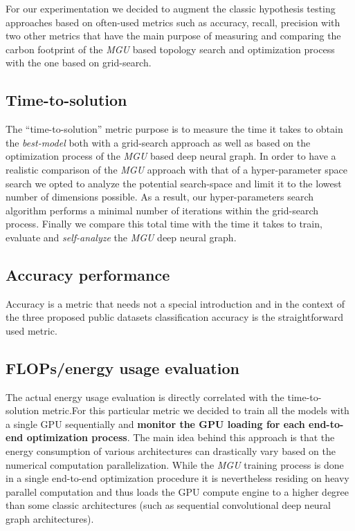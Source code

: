 \documentclass[11pt]{article}
\begin{document}
For our experimentation we decided to augment the classic hypothesis
testing approaches based on often-used metrics such as accuracy, recall,
precision with two other metrics that have the main purpose of measuring
and comparing the carbon footprint of the \emph{MGU} based topology
search and optimization process with the one based on grid-search.

\hypertarget{time-to-solution}{%
\subsection{Time-to-solution}\label{time-to-solution}}

The ``time-to-solution'' metric purpose is to measure the time it takes
to obtain the \emph{best-model} both with a grid-search approach as well
as based on the optimization process of the \emph{MGU} based deep neural
graph. In order to have a realistic comparison of the \emph{MGU}
approach with that of a hyper-parameter space search we opted to analyze
the potential search-space and limit it to the lowest number of
dimensions possible. As a result, our hyper-parameters search algorithm
performs a minimal number of iterations within the grid-search process.
Finally we compare this total time with the time it takes to train,
evaluate and \emph{self-analyze} the \emph{MGU} deep neural graph.

\hypertarget{accuracy-performance}{%
\subsection{Accuracy performance}\label{accuracy-performance}}

Accuracy is a metric that needs not a special introduction and in the
context of the three proposed public datasets classification accuracy is
the straightforward used metric.

\hypertarget{flopsenergy-usage-evaluation}{%
\subsection{FLOPs/energy usage
evaluation}\label{flopsenergy-usage-evaluation}}

The actual energy usage evaluation is directly correlated with the
time-to-solution metric.For this particular metric we decided to train
all the models with a single GPU sequentially and \textbf{monitor the
GPU loading for each end-to-end optimization process}. The main idea
behind this approach is that the energy consumption of various
architectures can drastically vary based on the numerical computation
parallelization. While the \emph{MGU} training process is done in a
single end-to-end optimization procedure it is nevertheless residing on
heavy parallel computation and thus loads the GPU compute engine to a
higher degree than some classic architectures (such as sequential
convolutional deep neural graph architectures).
\end{document}

